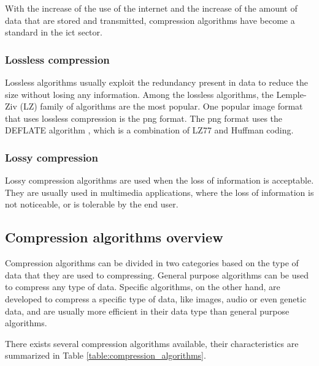 With the increase of the use of the internet and the increase of the amount of data that are stored and transmitted, compression algorithms have become a standard in the \ac{ict} sector.

\subsubsection{Lossless compression}

Lossless algorithms usually exploit the redundancy present in data to reduce the size without losing any information. Among the lossless algorithms, the Lemple-Ziv (LZ) family of algorithms are the most popular. One popular image format that uses lossless compression is the \ac{png} format. The \ac{png} format uses the DEFLATE algorithm \cite{rfc1951}, which is a combination of LZ77 and Huffman coding.

\subsubsection{Lossy compression}

Lossy compression algorithms are used when the loss of information is acceptable. They are usually used in multimedia applications, where the loss of information is not noticeable, or is tolerable by the end user.

\subsection{Compression algorithms overview}
\label{section:compression_algorithms_overview}

Compression algorithms can be divided in two categories based on the type of data that they are used to compressing. General purpose algorithms can be used to compress any type of data. Specific algorithms, on the other hand, are developed to compress a specific type of data, like images, audio or even genetic data, and are usually more efficient in their data type than general purpose algorithms.

There exists several compression algorithms available, their characteristics are summarized in Table \ref{table:compression_algorithms}.

